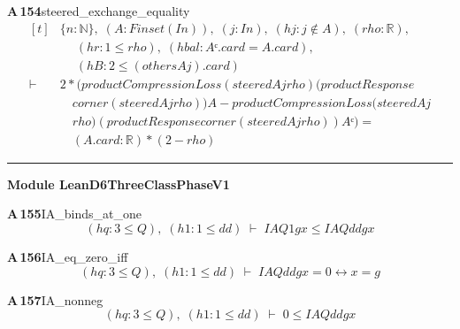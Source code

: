 \documentclass[conference]{IEEEtran}
\theoremstyle{definition}
\newcommand{\lean}[1]{\textsf{\footnotesize #1}}
\begin{document}
\noindent\textbf{A\,154}\quad\lean{steered\_exchange\_equality}
{\footnotesize\[ \begin{aligned}[t]
&\{ \mathit{n} : \mathbb{N} \},\; (\mathit{A} : \mathit{Finset} (\mathit{I} \mathit{n})),\; (\mathit{j} : \mathit{I} \mathit{n}),\; (\mathit{hj} : \mathit{j} \notin \mathit{A}),\; (\mathit{rho} : \mathbb{R} ),\\
&\quad \; (\mathit{hr} : 1 \leq \mathit{rho}),\; (\mathit{hbal} : \mathit{Aᶜ}.\mathit{card}=\mathit{A}.\mathit{card}),\\
&\quad \; (\mathit{hB} : 2 \leq (\mathit{others} \mathit{A} \mathit{j}).\mathit{card})\\
\vdash\;&2*(\mathit{productCompressionLoss} (\mathit{steered} \mathit{A} \mathit{j} \mathit{rho}) (\mathit{productResponse}\\
&\quad \mathit{corner} (\mathit{steered} \mathit{A} \mathit{j} \mathit{rho})) \mathit{A}- \mathit{productCompressionLoss} (\mathit{steered} \mathit{A} \mathit{j}\\
&\quad \mathit{rho}) (\mathit{productResponse} \mathit{corner} (\mathit{steered} \mathit{A} \mathit{j} \mathit{rho})) \mathit{Aᶜ})=\\
&\quad (\mathit{A}.\mathit{card}:\mathbb{R} )*(2-\mathit{rho})
\end{aligned} \]}

\vspace{4pt}\noindent\rule{\columnwidth}{0.4pt}\par\vspace{2pt}
\noindent\textbf{Module \lean{LeanD6ThreeClassPhaseV1}}\par\vspace{3pt}

\noindent\textbf{A\,155}\quad\lean{IA\_binds\_at\_one}
{\footnotesize\[ (\mathit{hq} : 3 \leq \mathit{Q}),\; (\mathit{h1} : 1 \leq \mathit{dd}) \;\vdash\; \mathit{IA} \mathit{Q} 1 \mathit{g} \mathit{x} \leq \mathit{IA} \mathit{Q} \mathit{dd} \mathit{g} \mathit{x} \]}

\noindent\textbf{A\,156}\quad\lean{IA\_eq\_zero\_iff}
{\footnotesize\[ (\mathit{hq} : 3 \leq \mathit{Q}),\; (\mathit{h1} : 1 \leq \mathit{dd}) \;\vdash\; \mathit{IA} \mathit{Q} \mathit{dd} \mathit{g} \mathit{x} = 0 \leftrightarrow \mathit{x} = \mathit{g} \]}

\noindent\textbf{A\,157}\quad\lean{IA\_nonneg}
{\footnotesize\[ (\mathit{hq} : 3 \leq \mathit{Q}),\; (\mathit{h1} : 1 \leq \mathit{dd}) \;\vdash\; 0 \leq \mathit{IA} \mathit{Q} \mathit{dd} \mathit{g} \mathit{x} \]}
\end{document}
